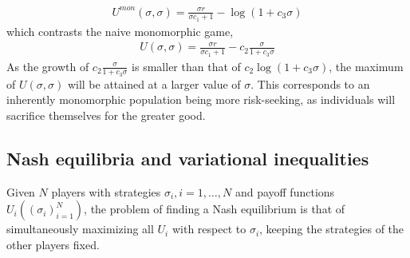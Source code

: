 \begin{align}
  U^{mon}(\sigma,\sigma) = \frac{\sigma r}{\sigma c_1 + 1} - \log(1+c_3 \sigma)
\end{align}
which contrasts the naive monomorphic game,
\begin{align}
  U(\sigma,\sigma) = \frac{\sigma r}{\sigma c_1 + 1} - c_2\frac{\sigma}{1 + c_3\sigma}
\end{align}
As the growth of $c_2\frac{\sigma}{1 + c_3\sigma}$ is smaller than that of $c_2\log(1+c_3 \sigma)$, the maximum of $U(\sigma,\sigma)$ will be attained at a larger value of $\sigma$. This corresponds to an inherently monomorphic population being more risk-seeking, as individuals will sacrifice themselves for the greater good.


\subsection*{Nash equilibria and variational inequalities}
Given $N$ players with strategies $\sigma_i, i = 1, \dots, N$ and payoff functions $U_i((\sigma_i)_{i=1}^N)$, the problem of finding a Nash equilibrium is that of simultaneously maximizing all $U_i$ with respect to $\sigma_i$, keeping the strategies of the other players fixed.

